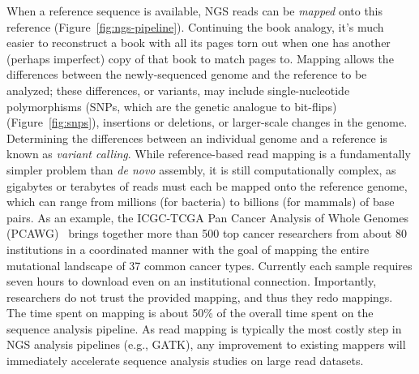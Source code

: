 \documentclass{acm_proc_article-sp}
\begin{document}
When a reference sequence is available, NGS reads can be \emph{mapped} onto
this reference (Figure~\ref{fig:ngs-pipeline}).
Continuing the book analogy, it's much easier to reconstruct a book with all its pages torn out when one has another (perhaps imperfect) copy of that book to match pages to.
Mapping allows the differences between the newly-sequenced genome and the 
reference to be analyzed; these differences, or variants, may include single-nucleotide polymorphisms
(SNPs, which are the genetic analogue to bit-flips) (Figure~\ref{fig:snps}), 
insertions or deletions, or larger-scale changes in the genome.
Determining the differences between an individual genome and a reference is
known as \emph{variant calling}.
While reference-based read mapping is a fundamentally simpler problem than
\emph{de novo} assembly, it is still computationally complex, as gigabytes or
terabytes of reads must each be mapped onto the reference genome, which can 
range from millions (for bacteria) to billions (for mammals) of base pairs.
As an example, the ICGC-TCGA Pan Cancer Analysis of Whole Genomes 
(PCAWG)~\cite{weinstein2013cancer} brings together more than 500 top cancer 
researchers from about 80 institutions in a coordinated manner with the goal of 
mapping the entire mutational landscape of 37 common cancer types. 
Currently each sample requires seven hours to download even on an institutional 
connection. 
Importantly, researchers do not trust the provided mapping, and thus they redo mappings. 
The time spent on mapping is about 50\% of the overall time spent on the sequence analysis pipeline. 
As read mapping is typically the most costly step in NGS analysis pipelines (e.g., GATK), any improvement to existing mappers will immediately accelerate sequence analysis studies on large read datasets.
\end{document}
